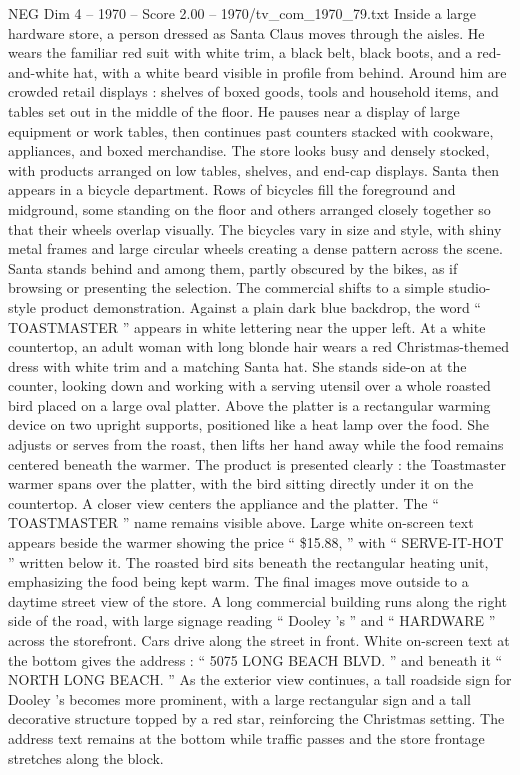 \begin{textsample}{NEG Dim 4 – 1970 – Score 2.00 – 1970/tv\_com\_1970\_79.txt}  \label{ex:f4_neg_016}
Inside a large hardware store, a person dressed as Santa Claus moves through the aisles.
He wears the familiar red suit with white trim, a black belt, black boots, and a red-and-white hat, with a white beard visible in profile from behind.
Around him are crowded retail displays : shelves of boxed goods, tools and household items, and tables set out in the middle of the floor.
He pauses near a display of large equipment or work tables, then continues past counters stacked with cookware, appliances, and boxed merchandise.
The store looks busy and densely stocked, with products arranged on low tables, shelves, and end-cap displays.
Santa then appears in a bicycle department.
Rows of bicycles fill the foreground and midground, some standing on the floor and others arranged closely together so that their wheels overlap visually.
The bicycles vary in size and style, with shiny metal frames and large circular wheels creating a dense pattern across the scene.
Santa stands behind and among them, partly obscured by the bikes, as if browsing or presenting the selection.
The commercial shifts to a simple studio-style product demonstration.
Against a plain dark blue backdrop, the word “ TOASTMASTER ” appears in white lettering near the upper left.
At a white countertop, an adult woman with long blonde hair wears a red Christmas-themed dress with white trim and a matching Santa hat.
She stands side-on at the counter, looking down and working with a serving utensil over a whole roasted bird placed on a large oval platter.
Above the platter is a rectangular warming device on two upright supports, positioned like a heat lamp over the food.
She adjusts or serves from the roast, then lifts her hand away while the food remains centered beneath the warmer.
The product is presented clearly : the Toastmaster warmer spans over the platter, with the bird sitting directly under it on the countertop.
A closer view centers the appliance and the platter.
The “ TOASTMASTER ” name remains visible above.
Large white on-screen text appears beside the warmer showing the price “ \$15.88, ” with “ SERVE-IT-HOT ” written below it.
The roasted bird sits beneath the rectangular heating unit, emphasizing the food being kept warm.
The final images move outside to a daytime street view of the store.
A long commercial building runs along the right side of the road, with large signage reading “ Dooley ’s ” and “ HARDWARE ” across the storefront.
Cars drive along the street in front.
White on-screen text at the bottom gives the address : “ 5075 LONG BEACH BLVD. ” and beneath it “ NORTH LONG BEACH. ” As the exterior view continues, a tall roadside sign for Dooley ’s becomes more prominent, with a large rectangular sign and a tall decorative structure topped by a red star, reinforcing the Christmas setting.
The address text remains at the bottom while traffic passes and the store frontage stretches along the block.

\end{textsample}
